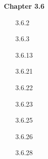 \documentclass[10pt,twoside,reqno]{article}
\begin{document}
\vspace{5mm}
\textbf{Chapter 3.6}
\begin{enumerate}
\item[3.6.2] 



\item[3.6.3] 



\item[3.6.13]  



\item[3.6.21]  



\item[3.6.22]  



\item[3.6.23] 



\item[3.6.25]  



\item[3.6.26]  



\item[3.6.28] 




\end{enumerate}
\end{document}
